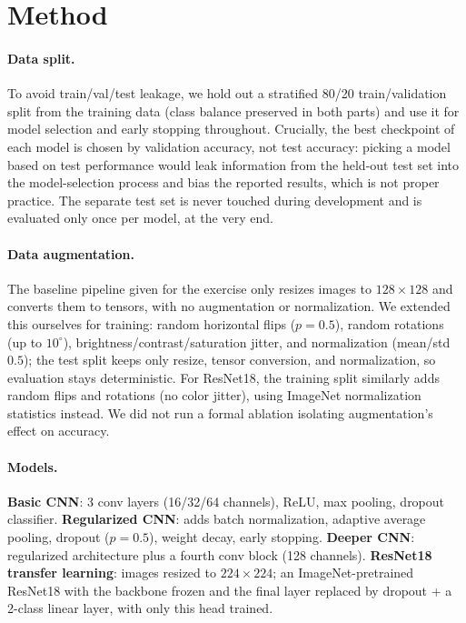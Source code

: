 \documentclass[10pt,twocolumn,letterpaper]{article}
\begin{document}
\section{Method}
\label{sec:method}

\paragraph{Data split.} To avoid train/val/test leakage, we hold out a stratified 80/20 train/validation split from the training data (class balance preserved in both parts) and use it for model selection and early stopping throughout. Crucially, the best checkpoint of each model is chosen by validation accuracy, not test accuracy: picking a model based on test performance would leak information from the held-out test set into the model-selection process and bias the reported results, which is not proper practice. The separate test set is never touched during development and is evaluated only once per model, at the very end.

\paragraph{Data augmentation.} The baseline pipeline given for the exercise only resizes images to $128\times128$ and converts them to tensors, with no augmentation or normalization. We extended this ourselves for training: random horizontal flips ($p{=}0.5$), random rotations (up to $10^\circ$), brightness/contrast/saturation jitter, and normalization (mean/std $0.5$); the test split keeps only resize, tensor conversion, and normalization, so evaluation stays deterministic. For ResNet18, the training split similarly adds random flips and rotations (no color jitter), using ImageNet normalization statistics instead. We did not run a formal ablation isolating augmentation's effect on accuracy.

\paragraph{Models.} \textbf{Basic CNN}: 3 conv layers (16/32/64 channels), ReLU, max pooling, dropout classifier. \textbf{Regularized CNN}: adds batch normalization, adaptive average pooling, dropout ($p{=}0.5$), weight decay, early stopping. \textbf{Deeper CNN}: regularized architecture plus a fourth conv block (128 channels). \textbf{ResNet18 transfer learning}: images resized to $224\times224$; an ImageNet-pretrained ResNet18 with the backbone frozen and the final layer replaced by dropout + a 2-class linear layer, with only this head trained.
\end{document}
